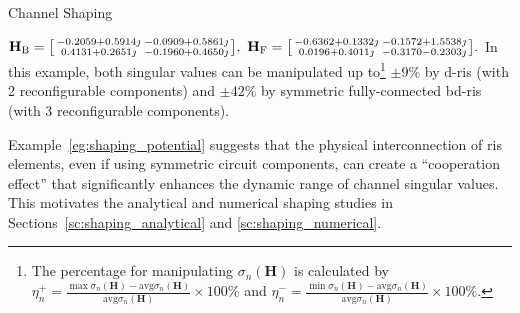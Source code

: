 \documentclass[journal]{IEEEtran}
\begin{document}
\begin{section}{Channel Shaping}
\begin{example}
		$
			\mathbf{H}_\mathrm{B} =
				\begin{bsmallmatrix}
					-0.2059 + 0.5914 \jmath & -0.0909 + 0.5861 \jmath \\
					0.4131 + 0.2651 \jmath  & -0.1960 + 0.4650 \jmath
				\end{bsmallmatrix}, \
				\mathbf{H}_\mathrm{F} =
				\begin{bsmallmatrix}
					-0.6362 + 0.1332 \jmath & -0.1572 + 1.5538 \jmath \\
					0.0196 + 0.4011 \jmath  & -0.3170 - 0.2303 \jmath
				\end{bsmallmatrix}.
		$
		In this example, both singular values can be manipulated up to\footnote{The percentage for manipulating $\sigma_n(\mathbf{H})$ is calculated by $\eta_n^+ = \frac{\max \sigma_n(\mathbf{H}) - \mathrm{avg} \sigma_n(\mathbf{H})}{\mathrm{avg} \sigma_n(\mathbf{H})} \times 100\%$ and  $\eta_n^- = \frac{\min \sigma_n(\mathbf{H}) - \mathrm{avg} \sigma_n(\mathbf{H})}{\mathrm{avg} \sigma_n(\mathbf{H})} \times 100\%$.} $\pm 9\%$ by \gls{d}-\gls{ris} (with 2 reconfigurable components) and $\pm 42\%$ by symmetric fully-connected \gls{bd}-\gls{ris} (with 3 reconfigurable components).
	\end{example}

	Example~\ref{eg:shaping_potential} suggests that the physical interconnection of \gls{ris} elements, even if using symmetric circuit components, can create a ``cooperation effect'' that significantly enhances the dynamic range of channel singular values.
	This motivates the analytical and numerical shaping studies in Sections~\ref{sc:shaping_analytical} and \ref{sc:shaping_numerical}.


\end{section}
\end{document}
